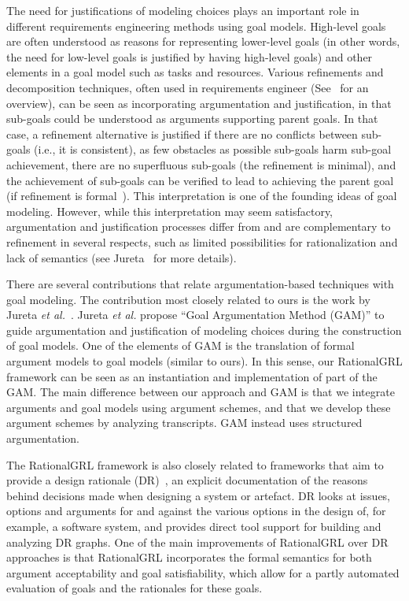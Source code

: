 The need for justifications of modeling choices plays an important role in different requirements engineering methods using goal models. High-level goals are often understood as reasons for representing lower-level goals (in other words, the need for low-level goals is justified by having high-level goals) and other elements in a goal model such as tasks and resources. Various refinements and decomposition techniques,  often used in requirements engineer (See~\cite{EP-2001-Lamsweerde-GORE} for an overview), can be seen as incorporating argumentation and justification, in that sub-goals could be understood as arguments supporting parent goals. In that case, a refinement alternative is justified if there are no conflicts between sub-goals (i.e., it is consistent), as few obstacles as possible sub-goals harm sub-goal achievement, there are no superfluous sub-goals (the refinement is minimal), and the achievement of sub-goals can be verified to lead to achieving the parent goal (if refinement is formal~\cite{Darimont:1996:FRP:239098.239131}). This interpretation is one of the founding ideas of goal modeling. However, while this interpretation may seem satisfactory, argumentation and justification processes differ from and are complementary to refinement in several respects, such as limited possibilities for rationalization and lack of semantics (see Jureta~\cite{Jureta:RE2008} for more details).

There are several contributions that relate argumentation-based techniques with goal modeling. The contribution most closely related to ours is the work by Jureta \emph{et al.}~\cite{Jureta:RE2008}. Jureta \emph{et al.} propose ``Goal Argumentation Method (GAM)'' to guide argumentation and justification of modeling choices during the construction of goal models. One of the elements of GAM is the translation of formal argument models to goal models (similar to ours). In this sense, our RationalGRL framework can be seen as an instantiation and implementation of  part of the GAM. The main difference between our approach and GAM is that we integrate arguments and goal models using argument schemes, and that we develop these argument schemes by analyzing transcripts. GAM instead uses structured argumentation. 

The RationalGRL framework is also closely related to frameworks that aim to provide a design rationale (DR)~\cite{shum2006hypermedia}, an explicit documentation of the reasons behind decisions made when designing a system or artefact. DR looks at issues, options and arguments for and against the various options in the design of, for example, a software system, and provides direct tool support for building and analyzing DR graphs. One of the main improvements of RationalGRL over DR approaches is that RationalGRL incorporates the formal semantics for both argument acceptability and goal satisfiability, which allow for a partly automated evaluation of goals and the rationales for these goals. 


